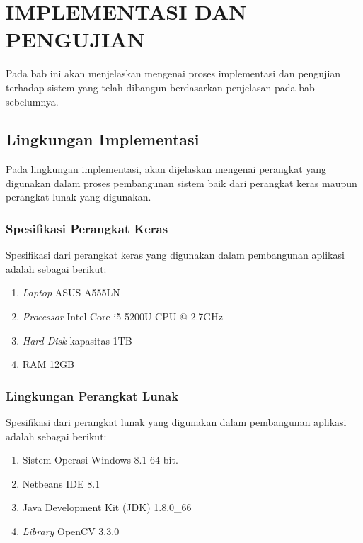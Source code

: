 \chapter{IMPLEMENTASI DAN PENGUJIAN}

%
\vspace{4.5pt}
\noindent Pada bab ini akan menjelaskan mengenai proses implementasi dan pengujian terhadap sistem yang telah dibangun berdasarkan penjelasan pada bab sebelumnya.\\

\section{Lingkungan Implementasi}
\noindent Pada lingkungan implementasi, akan dijelaskan mengenai perangkat yang digunakan dalam proses pembangunan sistem baik dari perangkat keras maupun perangkat lunak yang digunakan.\\

\subsection{Spesifikasi Perangkat Keras}
\noindent Spesifikasi dari perangkat keras yang digunakan dalam pembangunan aplikasi adalah sebagai berikut:
\begin{enumerate}
\item \textit{Laptop} ASUS A555LN
\item \textit{Processor} Intel Core i5-5200U CPU @ 2.7GHz
\item \textit{Hard Disk} kapasitas 1TB
\item RAM 12GB\\
\end{enumerate}

\subsection{Lingkungan Perangkat Lunak}
\noindent Spesifikasi dari perangkat lunak yang digunakan dalam pembangunan aplikasi adalah sebagai berikut:
\begin{enumerate}
\item Sistem Operasi Windows 8.1 64 bit.
\item Netbeans IDE 8.1
\item Java Development Kit (JDK) 1.8.0{\_}66
\item \textit{Library} OpenCV 3.3.0\\
\end{enumerate}

